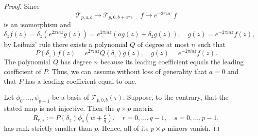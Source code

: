\documentclass[reqno,a4paper,12pt]{amsart}
\numberwithin{equation}{section}
\newcommand{\calT}{\mathcal T}
\newcommand{\dd}{\delta}
\begin{document}
\begin{proof}
{
Since 
\begin{equation}
    \calT_{p,a,b}\to \calT_{p,0,b+a\tau}, \quad f\mapsto e^{-2\pi i a\cdot} f
\end{equation}
is an isomorphism and 
\begin{equation}
    \dd_z f(z) = \dd_z \left(e^{2\pi i az}g(z)\right)= e^{2\pi i a z}(a g(z) + \dd_z g(z)),\quad g(z) = e^{-2\pi i az} f(z),
\end{equation}
by Leibniz' rule there exists a polynomial $Q$ of degree at most $n$ such that
\begin{equation}\label{eq:P_vs_Q_for_a}
    P(\dd_z) f (z) = e^{2\pi i a z} Q(\dd_z) g(z),\quad g(z) = e^{-2\pi i az} f(z). 
\end{equation}
The polynomial $Q$ has degree $n$ because its leading coefficient equals the leading coefficient of $P$. Thus, we can assume without loss of generality that $a=0$ and that $P$ has a leading coefficient equal to one.
}

{Let $\phi_0,\dots,\phi_{p-1}$ be a basis of $\calT_{p,0,b}(\tau)$.}  Suppose, to
the contrary, that the stated map is not injective.  Then the
$q\times p$ matrix
$$
R_{r,s}:={{P(\dd_z)}}\phi_s\left(w+\tfrac{r}{q}\right),
\quad
r=0,\dots,q-1,
\quad
s=0,\dots,p-1,
$$
has rank strictly smaller than $p$.  Hence, all of its $p\times p$ minors
vanish.


\end{proof}
\end{document}
